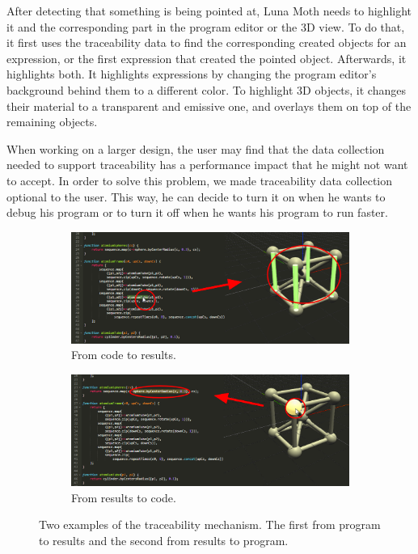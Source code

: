 After detecting that something is being pointed at, Luna Moth needs to highlight it and the corresponding part in the program editor or the 3D view.
To do that, it first uses the traceability data to find the corresponding created objects for an expression, or the first expression that created the pointed object.
Afterwards, it highlights both.
It highlights expressions by changing the program editor's background behind them to a different color.
To highlight 3D objects, it changes their material to a transparent and emissive one, and overlays them on top of the remaining objects.

When working on a larger design, the user may find that the data collection needed to support traceability has a performance impact that he might not want to accept.
In order to solve this problem, we made traceability data collection optional to the user.
This way, he can decide to turn it on when he wants to debug his program or to turn it off when he wants his program to run faster.

\begin{figure}
  \centering
  \begin{subfigure}[b]{1.0\textwidth}
    \includegraphics[width=1.0\textwidth]{./images/traceability_example/code_to_results_crop}
    \caption{From code to results.}
    \label{sub:code:to:results}
  \end{subfigure}

  \begin{subfigure}[b]{1.0\textwidth}
    \includegraphics[width=1.0\textwidth]{./images/traceability_example/results_to_code_crop}
    \caption{From results to code.}
    \label{sub:results:to:code}
  \end{subfigure}
  \caption{Two examples of the traceability mechanism. The first from program to results and the second from results to program.}
  \label{fig:trace:example}
\end{figure}


